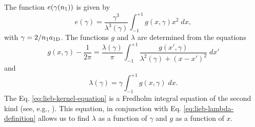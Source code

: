 The function $e(\gamma({{n}_1}))$ is given by
\cite{bib:lieb-phys-rev.130.1605.1963}
%
\begin{equation}
  \label{eq:lieb-liniger-energy-egamma}
  e(\gamma) = \frac{\gamma^3}{\lambda^3(\gamma)} \int_{-1}^{+1} g(x, \gamma) x^2 \; dx,
\end{equation}
%
with $\gamma = 2 / {{n}_1} a_{ \mathrm{1D} }$. The functions $g$ and $\lambda$ are
determined from the equations
%
\begin{equation}
  \label{eq:lieb-kernel-equation}
  g(x, \gamma) - \frac{1}{2\pi} = \frac{\lambda(\gamma)}{\pi} \int_{-1}^{+1} \frac{g(x', \gamma)}{\lambda^2(\gamma) + (x - x')^2} \; dx'
\end{equation}
%
and
%
\begin{equation}
  \label{eq:lieb-lambda-definition}
  \lambda(\gamma) = \gamma \int_{-1}^{+1} g(x, \gamma) \; dx.
\end{equation}
%
The Eq. \eqref{eq:lieb-kernel-equation} is a Fredholm integral equation of the
second kind (see, e.g., \cite[Chap. 2]{bib:zemyan-fredholm-integral.2012}). This
equation, in conjunction with Eq. \eqref{eq:lieb-lambda-definition} allows us to
find $\lambda$ as a function of $\gamma$ and $g$ as a function of $x$.

